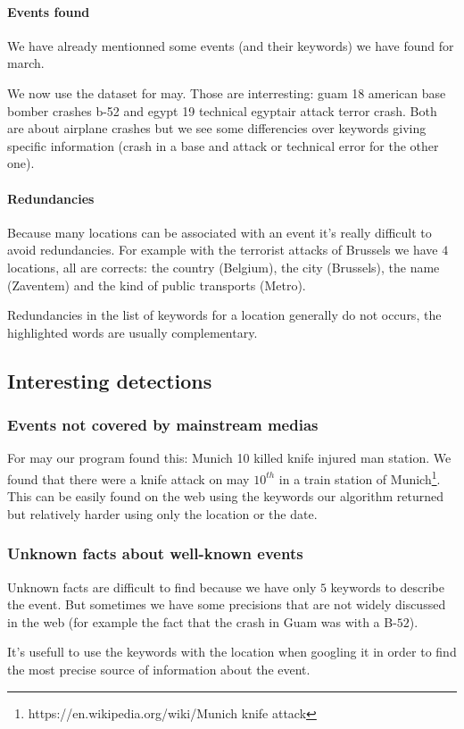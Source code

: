 \documentclass[a4paper]{article}
\begin{document}
\paragraph{Events found}

We have already mentionned some events (and their keywords) we have found for march.

We now use the dataset for may.
Those are interresting: guam 18 american base bomber crashes b-52 and egypt 19 technical egyptair attack terror crash.
Both are about airplane crashes but we see some differencies over keywords giving specific information (crash in a base and attack or technical error for the other one).

\paragraph{Redundancies}

Because many locations can be associated with an event it's really difficult to avoid redundancies.
For example with the terrorist attacks of Brussels we have $4$ locations, all are corrects: the country (Belgium), the city (Brussels), the name (Zaventem) and the kind of public transports (Metro).

Redundancies in the list of keywords for a location generally do not occurs, the highlighted words are usually complementary.

\subsection{Interesting detections}

\subsubsection{Events not covered by mainstream medias}

For may our program found this: Munich 10 killed knife injured man station.
We found that there were a knife attack on may $10^{th}$ in a train station of Munich\footnote{https://en.wikipedia.org/wiki/Munich knife attack}. This can be easily found on the web using the keywords our algorithm returned but relatively harder using only the location or the date.

\subsubsection{Unknown facts about well-known events}

Unknown facts are difficult to find because we have only $5$ keywords to describe the event. But sometimes we have some precisions that are not widely discussed in the web (for example the fact that the crash in Guam was with a B-$52$).

It's usefull to use the keywords with the location when googling it in order to find the most precise source of information about the event.
\end{document}
